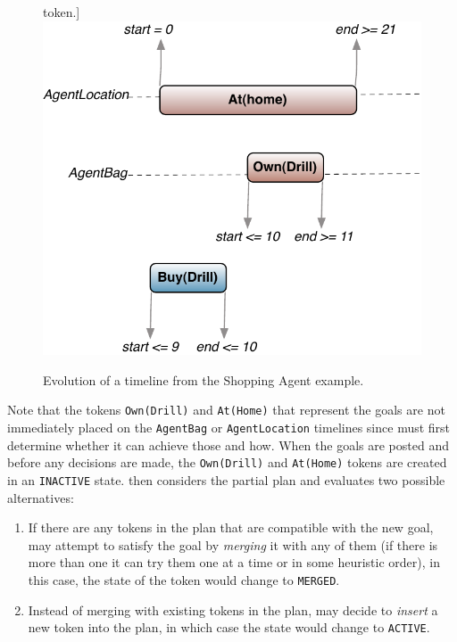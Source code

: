 \begin{description}
\begin{figure}[t]
    token.]{\label{fig:europapr:activate}\includegraphics[scale=0.4]{figs/europa-pr-activate.pdf}} 
    \caption{\small Evolution of a timeline from the Shopping Agent example.}
  \end{figure}


  Note that the tokens \texttt{Own(Drill)} and \texttt{At(Home)} that
  represent the goals are not immediately placed on the
  \texttt{AgentBag} or \texttt{AgentLocation} timelines since \eu must
  first determine whether it can achieve those  and
  how. When the goals are posted and before any decisions are made,
  the \texttt{Own(Drill)} and \texttt{At(Home)} tokens are created in
  an \texttt{INACTIVE} state. \eu then considers the partial plan and
  evaluates two possible alternatives:

\begin{enumerate}

\item If there are any tokens in the plan that are compatible with the
  new goal, \eu may attempt to satisfy the goal by \emph{merging} it
  with any of them (if there is more than one it can try them one at a
  time or in some heuristic order), in this case, the state of the
  token would change to \texttt{MERGED}.

\item Instead of merging with existing tokens in the plan, \eu may
  decide to \emph{insert} a new token into the plan, in which case the
  state would change to \texttt{ACTIVE}.


\end{enumerate}
\end{description}
